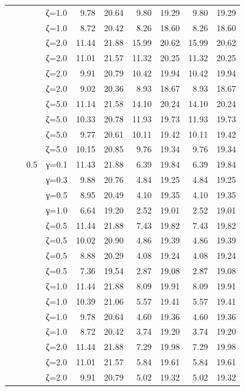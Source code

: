 \begin{table}[htbp]
\begin{tabular}{ll r l  rr  rr  rr}
  &  &  & ζ=1.0 & 9.78 & 20.64 & 9.80 & 19.29 & 9.80 & 19.29 \\
  &  &  & ζ=1.0 & 8.72 & 20.42 & 8.26 & 18.60 & 8.26 & 18.60 \\
  &  &  & ζ=2.0 & 11.44 & 21.88 & 15.99 & 20.62 & 15.99 & 20.62 \\
  &  &  & ζ=2.0 & 11.01 & 21.57 & 11.32 & 20.25 & 11.32 & 20.25 \\
  &  &  & ζ=2.0 & 9.91 & 20.79 & 10.42 & 19.94 & 10.42 & 19.94 \\
  &  &  & ζ=2.0 & 9.02 & 20.36 & 8.93 & 18.67 & 8.93 & 18.67 \\
  &  &  & ζ=5.0 & 11.14 & 21.58 & 14.10 & 20.24 & 14.10 & 20.24 \\
  &  &  & ζ=5.0 & 10.33 & 20.78 & 11.93 & 19.73 & 11.93 & 19.73 \\
  &  &  & ζ=5.0 & 9.77 & 20.61 & 10.11 & 19.42 & 10.11 & 19.42 \\
  &  &  & ζ=5.0 & 10.15 & 20.85 & 9.76 & 19.34 & 9.76 & 19.34 \\
  &  & 0.5 & γ=0.1 & 11.43 & 21.88 & 6.39 & 19.84 & 6.39 & 19.84 \\
  &  &  & γ=0.3 & 9.88 & 20.76 & 4.84 & 19.25 & 4.84 & 19.25 \\
  &  &  & γ=0.5 & 8.95 & 20.49 & 4.10 & 19.35 & 4.10 & 19.35 \\
  &  &  & γ=1.0 & 6.64 & 19.20 & 2.52 & 19.01 & 2.52 & 19.01 \\
  &  &  & ζ=0.5 & 11.44 & 21.88 & 7.43 & 19.82 & 7.43 & 19.82 \\
  &  &  & ζ=0.5 & 10.02 & 20.90 & 4.86 & 19.39 & 4.86 & 19.39 \\
  &  &  & ζ=0.5 & 8.88 & 20.29 & 4.08 & 19.24 & 4.08 & 19.24 \\
  &  &  & ζ=0.5 & 7.36 & 19.54 & 2.87 & 19.08 & 2.87 & 19.08 \\
  &  &  & ζ=1.0 & 11.44 & 21.88 & 8.09 & 19.91 & 8.09 & 19.91 \\
  &  &  & ζ=1.0 & 10.39 & 21.06 & 5.57 & 19.41 & 5.57 & 19.41 \\
  &  &  & ζ=1.0 & 9.78 & 20.64 & 4.60 & 19.36 & 4.60 & 19.36 \\
  &  &  & ζ=1.0 & 8.72 & 20.42 & 3.74 & 19.20 & 3.74 & 19.20 \\
  &  &  & ζ=2.0 & 11.44 & 21.88 & 7.29 & 19.98 & 7.29 & 19.98 \\
  &  &  & ζ=2.0 & 11.01 & 21.57 & 5.84 & 19.61 & 5.84 & 19.61 \\
  &  &  & ζ=2.0 & 9.91 & 20.79 & 5.02 & 19.32 & 5.02 & 19.32 \\

\end{tabular}
\end{table}
